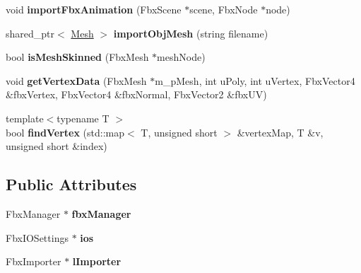 \begin{DoxyCompactItemize}
\item 
\hypertarget{class_mesh_importer_a16f2e17c0789d1ba30c82c54631d6c54}{}void {\bfseries import\+Fbx\+Animation} (Fbx\+Scene $\ast$scene, Fbx\+Node $\ast$node)\label{class_mesh_importer_a16f2e17c0789d1ba30c82c54631d6c54}

\item 
\hypertarget{class_mesh_importer_a2ee7226a821d06fb7b800e4d600ad781}{}shared\+\_\+ptr$<$ \hyperlink{class_mesh}{Mesh} $>$ {\bfseries import\+Obj\+Mesh} (string filename)\label{class_mesh_importer_a2ee7226a821d06fb7b800e4d600ad781}

\item 
\hypertarget{class_mesh_importer_afd1e9b2a4bbb695888073f5bbe01f70a}{}bool {\bfseries is\+Mesh\+Skinned} (Fbx\+Mesh $\ast$mesh\+Node)\label{class_mesh_importer_afd1e9b2a4bbb695888073f5bbe01f70a}

\item 
\hypertarget{class_mesh_importer_abde4c4f38e08ba95fbc292a43520b009}{}void {\bfseries get\+Vertex\+Data} (Fbx\+Mesh $\ast$m\+\_\+p\+Mesh, int u\+Poly, int u\+Vertex, Fbx\+Vector4 \&fbx\+Vertex, Fbx\+Vector4 \&fbx\+Normal, Fbx\+Vector2 \&fbx\+U\+V)\label{class_mesh_importer_abde4c4f38e08ba95fbc292a43520b009}

\item 
\hypertarget{class_mesh_importer_ae0bc798bf57d675b52a438777a561ea8}{}{\footnotesize template$<$typename T $>$ }\\bool {\bfseries find\+Vertex} (std\+::map$<$ T, unsigned short $>$ \&vertex\+Map, T \&v, unsigned short \&index)\label{class_mesh_importer_ae0bc798bf57d675b52a438777a561ea8}

\end{DoxyCompactItemize}
\subsection*{Public Attributes}
\begin{DoxyCompactItemize}
\item 
\hypertarget{class_mesh_importer_ae85eb3068f2e8f80fffa67e0b516d69c}{}Fbx\+Manager $\ast$ {\bfseries fbx\+Manager}\label{class_mesh_importer_ae85eb3068f2e8f80fffa67e0b516d69c}

\item 
\hypertarget{class_mesh_importer_aa78bacc0afc35c16656dabefed686c84}{}Fbx\+I\+O\+Settings $\ast$ {\bfseries ios}\label{class_mesh_importer_aa78bacc0afc35c16656dabefed686c84}

\item 
\hypertarget{class_mesh_importer_ad5d179f8f8c3f993c5779930775df83c}{}Fbx\+Importer $\ast$ {\bfseries l\+Importer}\label{class_mesh_importer_ad5d179f8f8c3f993c5779930775df83c}

\end{DoxyCompactItemize}



